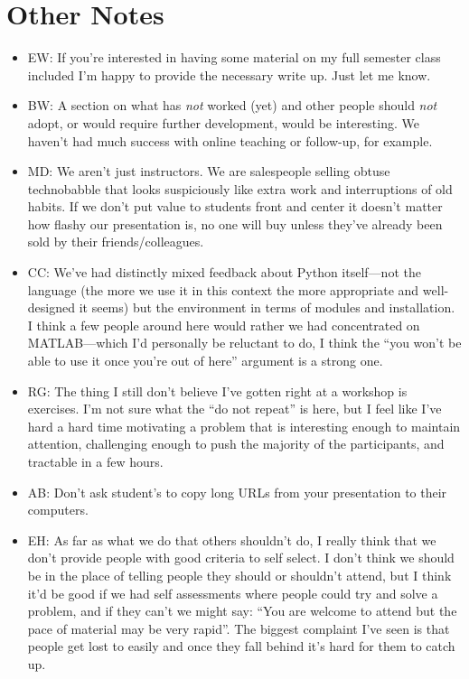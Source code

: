 \documentclass{article}
\begin{document}
\section{Other Notes}

\begin{itemize}

  \item EW: If you're interested in having some material on my full
    semester class included I'm happy to provide the necessary write
    up. Just let me know.

  \item BW: A section on what has {\em not} worked (yet) and other people
    should {\em not} adopt, or would require further development, would
    be interesting. We haven't had much success with online teaching or
    follow-up, for example.

  \item MD: We aren't just instructors. We are salespeople selling
    obtuse technobabble that looks suspiciously like extra work and
    interruptions of old habits. If we don't put value to students
    front and center it doesn't matter how flashy our presentation is,
    no one will buy unless they've already been sold by their
    friends/colleagues.

  \item CC: We've had distinctly mixed feedback about Python
    itself---not the language (the more we use it in this context the
    more appropriate and well-designed it seems) but the environment
    in terms of modules and installation. I think a few people around
    here would rather we had concentrated on MATLAB---which I'd
    personally be reluctant to do, I think the ``you won't be able to
    use it once you're out of here'' argument is a strong one.

  \item RG: The thing I still don't believe I've gotten right at a
    workshop is exercises. I'm not sure what the ``do not repeat'' is
    here, but I feel like I've hard a hard time motivating a problem
    that is interesting enough to maintain attention, challenging
    enough to push the majority of the participants, and tractable in
    a few hours.

  \item AB: Don't ask student's to copy long URLs from your
    presentation to their computers.

  \item EH: As far as what we do that others shouldn't do, I really
    think that we don't provide people with good criteria to self
    select.  I don't think we should be in the place of telling people
    they should or shouldn't attend, but I think it'd be good if we
    had self assessments where people could try and solve a problem,
    and if they can't we might say: ``You are welcome to attend but
    the pace of material may be very rapid''.  The biggest complaint
    I've seen is that people get lost to easily and once they fall
    behind it's hard for them to catch up.


\end{itemize}
\end{document}
